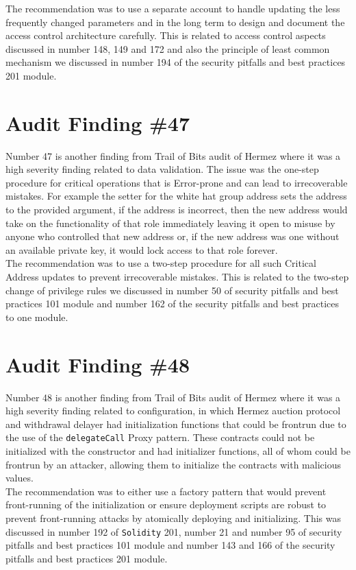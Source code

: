 The recommendation was to use a separate account to handle updating the less frequently changed parameters and in the long term to design and document the access control architecture carefully. This is related to access control aspects discussed in number 148, 149 and 172 and also the principle of least common mechanism we discussed in number 194 of the security pitfalls and best practices 201 module.

\section{Audit Finding \#47}

Number 47 is another finding from Trail of Bits audit of Hermez where it was a high severity finding related to data validation. The issue was the one-step procedure for critical operations that is Error-prone and can lead to irrecoverable mistakes. For example the setter for the white hat group address sets the address to the provided argument, if the address is incorrect, then the new address would take on the functionality of that role immediately leaving it open to misuse by anyone who controlled that new address or, if the new address was one without an available private key, it would lock access to that role forever.\\

The recommendation was to use a two-step procedure for all such Critical Address updates to prevent irrecoverable mistakes. This is related to the two-step change of privilege rules we discussed in number 50 of security pitfalls and best practices 101 module and number 162 of the security pitfalls and best practices to one module.

\section{Audit Finding \#48}

Number 48 is another finding from Trail of Bits audit of Hermez where it was a high severity finding related to configuration, in which Hermez auction protocol and withdrawal delayer had initialization functions that could be frontrun due to the use of the \verb|delegateCall| Proxy pattern. These contracts could not be initialized with the constructor and had initializer functions, all of whom could be frontrun by an attacker, allowing them to initialize the contracts with malicious values.\\

The recommendation was to either use a factory pattern that would prevent front-running of the initialization or ensure deployment scripts are robust to prevent front-running attacks by atomically deploying and initializing. This was discussed in number 192 of \verb|Solidity| 201, number 21 and number 95 of security pitfalls and best practices 101 module and number 143 and 166 of the security pitfalls and best practices 201 module.


